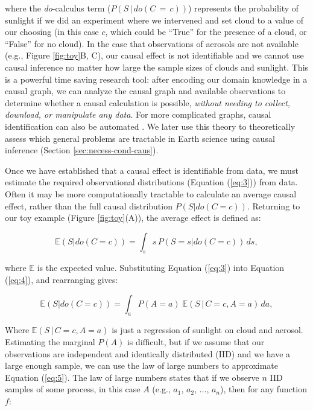 \documentclass[12pt]{article}
\begin{document}
where the \textit{do}-calculus \citep{pearl2009} term
($P(S \, | \, do(C\, = \,c))$) represents the probability of sunlight
if we did an experiment where we intervened and set cloud to a value
of our choosing (in this case $c$, which could be ``True'' for the
presence of a cloud, or ``False'' for no cloud). In the case that
observations of aerosols are not available (e.g., Figure
\ref{fig:toy}B, C), our causal effect is not identifiable and we
cannot use causal inference no matter how large the sample sizes of
clouds and sunlight. This is a powerful time saving research tool:
after encoding our domain knowledge in a causal graph, we can analyze
the causal graph and available observations to determine whether a
causal calculation is possible, \textit{without needing to collect,
  download, or manipulate any data}. For more complicated graphs,
causal identification can also be automated \citep{shpitser2006}. We
later use this theory to theoretically assess which general problems
are tractable in Earth science using causal inference (Section
\ref{sec:necess-cond-caus}).

Once we have established that a causal effect is identifiable from
data, we must estimate the required observational distributions
(Equation (\ref{eq:3})) from data. Often it may be more computationally
tractable to calculate an average causal effect, rather than the full
causal distribution $P(S | do(C=c))$. Returning to our toy example
(Figure \ref{fig:toy}(A)), the average effect is defined as:

\begin{equation}
  \mathbb{E}(S | do(C = c)) = \int_{s} s \, P(S = s
  | do(C=c)) \, ds,
  \label{eq:4}
\end{equation}

where $\mathbb{E}$ is the expected value. Substituting Equation
(\ref{eq:3}) into Equation (\ref{eq:4}), and rearranging gives:

\begin{equation}
  \mathbb{E}(S | do(C = c))  = \int_{a} P(A=a) \; \mathbb{E}(S \, | \,
  C=c, A=a) \, d a,
  \label{eq:5}
\end{equation}

Where $\mathbb{E}(S \, | \, C=c, A=a)$ is just a regression of sunlight on
cloud and aerosol. Estimating the marginal $P(A)$ is difficult, but
if we assume that our observations are independent and identically
distributed (IID) and we have a large enough sample, we can use the
law of large numbers to approximate Equation (\ref{eq:5}). The law of
large numbers states that if we observe $n$ IID samples of some process, in
this case $A$ (e.g., $a_1$, $a_2$, $\ldots$, $a_n$), then for any
function $f$:
\end{document}
